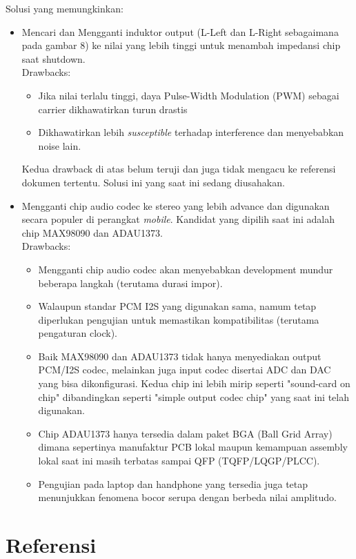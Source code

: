\documentclass[12pt,]{article}
\begin{document}
	Solusi yang memungkinkan:
	\begin{itemize}
		\item Mencari dan Mengganti induktor output (L-Left dan L-Right sebagaimana pada gambar 8) ke nilai yang lebih tinggi untuk menambah impedansi chip saat shutdown.\\
		Drawbacks:
		\begin{itemize}
			\item Jika nilai terlalu tinggi, daya Pulse-Width Modulation (PWM) sebagai carrier dikhawatirkan turun drastis
			
			\item Dikhawatirkan lebih \textit{susceptible} terhadap interference dan menyebabkan noise lain.
		\end{itemize}
		Kedua drawback di atas belum teruji dan juga tidak mengacu ke referensi dokumen tertentu. Solusi ini yang saat ini sedang diusahakan.
		
		\item Mengganti chip audio codec ke stereo yang lebih advance dan digunakan secara populer di perangkat \textit{mobile}.
		Kandidat yang dipilih saat ini adalah chip MAX98090\cite{max98090} dan ADAU1373\cite{adau1373}.\\
		Drawbacks:
		\begin{itemize}
			\item Mengganti chip audio codec akan menyebabkan development mundur beberapa langkah (terutama durasi impor).
			
			\item Walaupun standar PCM I2S yang digunakan sama, namum tetap diperlukan pengujian untuk memastikan kompatibilitas (terutama pengaturan clock).
			
			\item Baik MAX98090 dan ADAU1373 tidak hanya menyediakan output PCM/I2S codec, melainkan juga input codec disertai ADC dan DAC yang bisa dikonfigurasi.
			Kedua chip ini lebih mirip seperti "sound-card on chip" dibandingkan seperti "simple output codec chip" yang saat ini telah digunakan.
			
			\item Chip ADAU1373 hanya tersedia dalam paket BGA (Ball Grid Array) dimana sepertinya manufaktur PCB lokal maupun kemampuan assembly lokal saat ini
			masih terbatas sampai QFP (TQFP/LQGP/PLCC).
			
			\item Pengujian pada laptop dan handphone yang tersedia juga tetap menunjukkan fenomena bocor serupa dengan berbeda nilai amplitudo.
		\end{itemize}
		
			
	\end{itemize}
	
	\newpage
	\section{Referensi}
	\label{}
	
	
	
		
\end{document}
